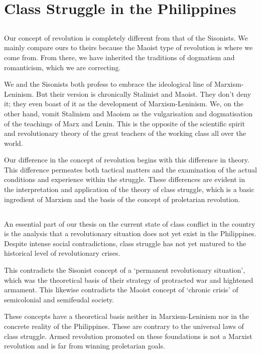 \chapter{Class Struggle
in the Philippines}
\section{}
Our concept of revolution is completely different from that of the Sisonists. 
We mainly compare ours to theirs 
because the Maoist type of revolution 
is where we come from. 
From there, we have inherited the traditions of dogmatism and romanticism,
which we are correcting.

We and the Sisonists both profess to embrace 
the ideological line of Marxism-Leninism. 
But their version is chronically Stalinist and Maoist. 
They don't deny it;
they even boast of it 
as the development of Marxism-Leninism. 
We, on the other hand, 
vomit Stalinism and Maoism 
as the vulgarisation and dogmatisation of the teachings of Marx and Lenin. 
This is the opposite of the scientific spirit and revolutionary theory 
of the great teachers of the working class all over the world.

Our difference in the concept of revolution 
begins with this difference in theory. 
This difference permeates 
both tactical matters 
and the examination of the actual conditions and experience within the struggle.
These differences are evident 
in the interpretation and application 
of the theory of class struggle,
which is a basic ingredient of Marxism 
and the basis of the concept of proletarian revolution.

\section{}
An essential part of our thesis 
on the current state of class conflict in the country 
is the analysis 
that a revolutionary situation 
does not yet exist in the Philippines. 
Despite intense social contradictions, 
class struggle has not yet matured 
to the historical level of revolutionary crises.

This contradicts the Sisonist concept of a `permanent revolutionary situation', 
which was the theoretical basis of their strategy 
of protracted war and hightened armament. 
This likewise contradicts the Maoist concept of `chronic crisis' 
of semicolonial and semifeudal society.

These concepts have a theoretical basis 
neither in Marxism-Leninism 
nor in the concrete reality of the Philippines. 
These are contrary to the universal laws of class struggle. 
Armed revolution promoted on these foundations
is not a Marxist revolution 
and is far from winning proletarian goals.

